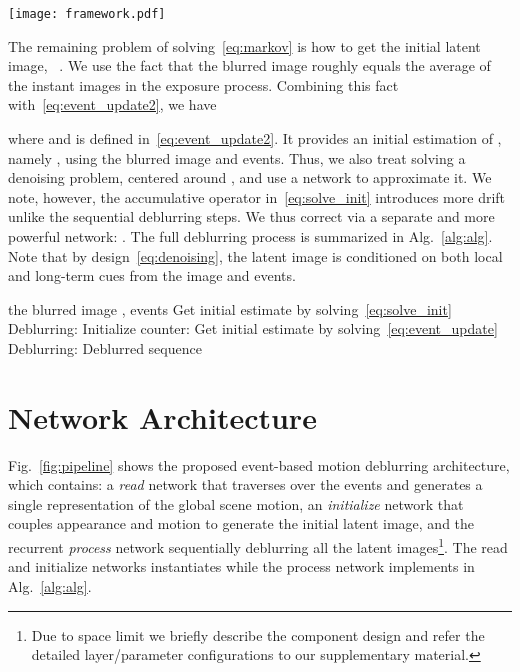 \documentclass[10pt,twocolumn,letterpaper]{article}
\begin{document}
\begin{figure*}[!t]
	\centering
	\texttt{[image: framework.pdf]}
	\caption{The proposed learning framework for event-based motion deblurring. For better visualization, we only assume  sharp frames are recovered from the blurred image. Detailed layer and parameter configurations are referred to the supplementary material. Note that the Motion Compensation (MC) module is not illustrated due to the lack of space. See text for detailed description of the architecture.  } 
	\label{fig:pipeline}
\end{figure*}

The remaining problem of solving~\eqref{eq:markov} is how to get the initial latent image, \ie~. We use the fact that the blurred image  roughly equals the average of the instant images in the exposure process. Combining this fact with~\eqref{eq:event_update2}, we have

where  and  is defined in~\eqref{eq:event_update2}. It provides an initial estimation of , namely , using the blurred image  and events. Thus, we also treat solving  a denoising problem, centered around , and use a network to approximate it. We note, however, the accumulative operator in~\eqref{eq:solve_init} introduces more drift unlike the sequential deblurring steps. We thus correct  via a separate and more powerful network: . The full deblurring process is summarized in Alg.~\ref{alg:alg}. Note that by design~\eqref{eq:denoising}, the latent image is conditioned on both local and long-term cues from the image and events.
\begin{algorithm}
	\caption{Event-assisted Deep Motion Deblurring}
	\label{alg:alg}
	\begin{algorithmic}[1]
		\REQUIRE the blurred image , events 
		\STATE Get initial estimate  by solving~\eqref{eq:solve_init}
		\STATE Deblurring: 
		\STATE Initialize counter: 
		\WHILE{}
		\STATE Get initial estimate  by solving~\eqref{eq:event_update}
		\STATE Deblurring: 
		\STATE 
		\ENDWHILE
		\RETURN Deblurred sequence 
	\end{algorithmic}
\end{algorithm}

\vspace{-2mm}
\section{Network Architecture}
Fig.~\ref{fig:pipeline} shows the proposed event-based motion deblurring architecture, which contains: a \textit{read} network that traverses over the events and generates a single representation of the global scene motion, an \textit{initialize} network that couples appearance and motion to generate the initial latent image, and the recurrent \textit{process} network sequentially deblurring all the latent images\footnote{Due to space limit we briefly describe the component design and refer the detailed layer/parameter configurations to our supplementary material.}. The read and initialize networks instantiates  while the process network implements  in Alg.~\ref{alg:alg}.
\end{document}
